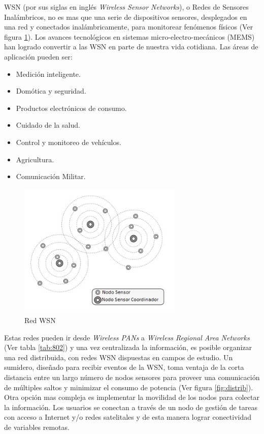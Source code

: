 WSN (por sus siglas en inglés \textit{Wireless Sensor Networks}), o Redes de Sensores Inalámbricos, no es mas que una serie de dispositivos sensores, desplegados en una red y conectados inalámbricamente, para monitorear fenómenos físicos (Ver figura \ref{fig:wsn}). Los avances tecnológicos en sistemas micro-electro-mecánicos (MEMS) han logrado convertir a las WSN en parte de nuestra vida cotidiana. Las áreas de aplicación pueden ser:
		\begin{itemize}
			\item Medición inteligente.
			\item Domótica y seguridad.
			\item Productos electrónicos de consumo.
			\item Cuidado de la salud.
			\item Control y monitoreo de vehículos.
			\item Agricultura.
			\item Comunicación Militar.
		\end{itemize}

\vspace{10px}
		
\begin{figure}[h!]
	\centering
    \includegraphics[width=0.7\textwidth]{./Figures/WSN.jpg}
    	\caption{Red WSN}
	\label{fig:wsn}
\end{figure}
		
Estas redes pueden ir desde \textit{Wireless PANs} a \textit{Wireless Regional Area Networks} (Ver tabla \ref{tab:802}) y una vez centralizada la información, es posible organizar una red distribuida, con redes WSN dispuestas en campos de estudio. Un sumidero, diseñado para recibir eventos de la WSN, toma ventaja de la corta distancia entre un largo número de nodos sensores para proveer una comunicación de múltiples saltos y minimizar el consumo de potencia (Ver figura \ref{fig:distrib}). Otra opción mas compleja es implementar la movilidad de los nodos para colectar la información. Los usuarios se conectan a través de un nodo de gestión de tareas con acceso a Internet y/o redes satelitales y de esta manera lograr conectividad de variables remotas.


